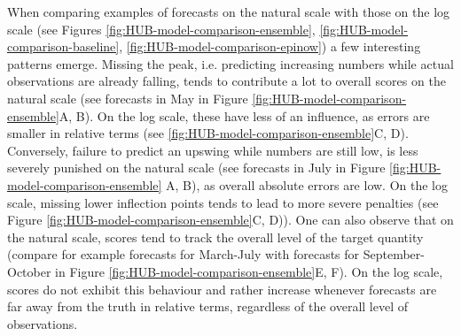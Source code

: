 \documentclass{article}
\begin{document}
When comparing examples of forecasts on the natural scale with those on the log scale (see Figures \ref{fig:HUB-model-comparison-ensemble}, \ref{fig:HUB-model-comparison-baseline}, \ref{fig:HUB-model-comparison-epinow}) a few interesting patterns emerge. Missing the peak, i.e. predicting increasing numbers while actual observations are already falling, tends to contribute a lot to overall scores on the natural scale (see forecasts in May in Figure \ref{fig:HUB-model-comparison-ensemble}A, B). On the log scale, these have less of an influence, as errors are smaller in relative terms (see \ref{fig:HUB-model-comparison-ensemble}C, D). Conversely, failure to predict an upswing while numbers are still low, is less severely punished on the natural scale (see forecasts in July in Figure \ref{fig:HUB-model-comparison-ensemble} A, B), as overall absolute errors are low. On the log scale, missing lower inflection points tends to lead to more severe penalties (see Figure \ref{fig:HUB-model-comparison-ensemble}C, D)). One can also observe that on the natural scale, scores tend to track the overall level of the target quantity (compare for example forecasts for March-July with forecasts for September-October in Figure \ref{fig:HUB-model-comparison-ensemble}E, F). On the log scale, scores do not exhibit this behaviour and rather increase whenever forecasts are far away from the truth in relative terms, regardless of the overall level of observations. 
\end{document}
